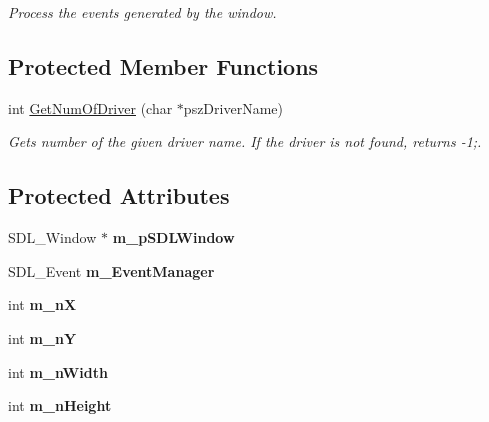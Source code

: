 \begin{DoxyCompactItemize}
\begin{DoxyCompactList}\small\item\em Process the events generated by the window. \end{DoxyCompactList}\end{DoxyCompactItemize}
\subsection*{Protected Member Functions}
\begin{DoxyCompactItemize}
\item 
int \hyperlink{classae_core_1_1ae_app_window_a6be4903a3ccd59a7cf13273713c97ee6}{Get\+Num\+Of\+Driver} (char $\ast$psz\+Driver\+Name)
\begin{DoxyCompactList}\small\item\em Gets number of the given driver name. If the driver is not found, returns -\/1;. \end{DoxyCompactList}\end{DoxyCompactItemize}
\subsection*{Protected Attributes}
\begin{DoxyCompactItemize}
\item 
S\+D\+L\+\_\+\+Window $\ast$ {\bfseries m\+\_\+p\+S\+D\+L\+Window}\hypertarget{classae_core_1_1ae_app_window_a623a750256b968ba0d166b80ab278dfb}{}\label{classae_core_1_1ae_app_window_a623a750256b968ba0d166b80ab278dfb}

\item 
S\+D\+L\+\_\+\+Event {\bfseries m\+\_\+\+Event\+Manager}\hypertarget{classae_core_1_1ae_app_window_a8488cd70bd33a42e4d1aedc8c52406cc}{}\label{classae_core_1_1ae_app_window_a8488cd70bd33a42e4d1aedc8c52406cc}

\item 
int {\bfseries m\+\_\+nX}\hypertarget{classae_core_1_1ae_app_window_aaa518091b236dc363d85d730a5997bd1}{}\label{classae_core_1_1ae_app_window_aaa518091b236dc363d85d730a5997bd1}

\item 
int {\bfseries m\+\_\+nY}\hypertarget{classae_core_1_1ae_app_window_a4af3e59640e73609ca1f0e360a23660a}{}\label{classae_core_1_1ae_app_window_a4af3e59640e73609ca1f0e360a23660a}

\item 
int {\bfseries m\+\_\+n\+Width}\hypertarget{classae_core_1_1ae_app_window_add39b144d8a4ee68140b584255bb2d90}{}\label{classae_core_1_1ae_app_window_add39b144d8a4ee68140b584255bb2d90}

\item 
int {\bfseries m\+\_\+n\+Height}\hypertarget{classae_core_1_1ae_app_window_a0261e767dab03b2dfe8ffeaffe6c3ba0}{}\label{classae_core_1_1ae_app_window_a0261e767dab03b2dfe8ffeaffe6c3ba0}

\end{DoxyCompactItemize}


